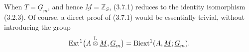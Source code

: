 When $T=\underline G_m$, and hence $\underline M=\mathbb Z_S$,
(3.7.1) reduces to the identity isomorphism (3.2.3).  Of course, a
direct proof of (3.7.1) would be essentially trivial, without
introducing the group
\[
 \Ext^1\bigl(A\mathbin{\mathop{\otimes}^{\mathbb L}}\underline M,
              \underline G_m\bigr)
 =\Biext^1(A,\underline M;\underline G_m).
\]


